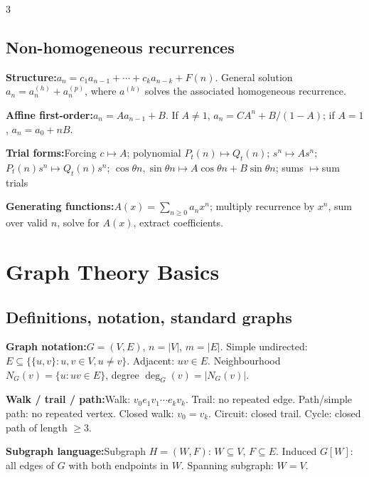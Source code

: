 \documentclass[10pt]{article}
\newenvironment{cheatitems}{\par\vspace{-1pt}}{\par\vspace{-1pt}}
\newcommand{\cheatrow}[2]{\par\noindent\textbf{#1:}\enspace #2\par}
\begin{document}
\begin{multicols}{3}
\subsection*{Non-homogeneous recurrences}
\begin{cheatitems}
\cheatrow{Structure}{$a_n=c_1a_{n-1}+\cdots+c_ka_{n-k}+F(n)$. General solution $a_n=a_n^{(h)}+a_n^{(p)}$, where $a^{(h)}$ solves the associated homogeneous recurrence.}
\cheatrow{Affine first-order}{$a_n=Aa_{n-1}+B$. If $A\ne1$, $a_n=CA^n+B/(1-A)$; if $A=1$, $a_n=a_0+nB$.}
\cheatrow{Trial forms}{Forcing $c\mapsto A$; polynomial $P_t(n)\mapsto Q_t(n)$; $s^n\mapsto As^n$; $P_t(n)s^n\mapsto Q_t(n)s^n$; $\cos\theta n,\sin\theta n\mapsto A\cos\theta n+B\sin\theta n$; sums $\mapsto$sum trials}
\cheatrow{Generating functions}{$A(x)=\sum_{n\ge0}a_nx^n$; multiply recurrence by $x^n$, sum over valid $n$, solve for $A(x)$, extract coefficients.}
\end{cheatitems}

\section*{Graph Theory Basics}
\subsection*{Definitions, notation, standard graphs}
\begin{cheatitems}
\cheatrow{Graph notation}{$G=(V,E)$, $n=|V|$, $m=|E|$. Simple undirected: $E\subseteq\{\{u,v\}:u,v\in V,u\ne v\}$. Adjacent: $uv\in E$. Neighbourhood $N_G(v)=\{u:uv\in E\}$, degree $\deg_G(v)=|N_G(v)|$.}
\cheatrow{Walk / trail / path}{Walk: $v_0e_1v_1\cdots e_kv_k$. Trail: no repeated edge. Path/simple path: no repeated vertex. Closed walk: $v_0=v_k$. Circuit: closed trail. Cycle: closed path of length $\ge3$.}
\cheatrow{Subgraph language}{Subgraph $H=(W,F)$: $W\subseteq V$, $F\subseteq E$. Induced $G[W]$: all edges of $G$ with both endpoints in $W$. Spanning subgraph: $W=V$.}
\end{cheatitems}


\end{multicols}
\end{document}
